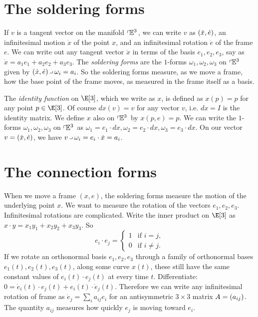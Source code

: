 \section{The soldering forms}
If \(v\) is a tangent vector on the manifold \(\left\ulcorner\!\mathbb{E}^{3}\right.\), we can write \(v\) as \(\left(\dot{x},\dot{e}\right)\), an infinitesimal motion \(\dot{x}\) of the point \(x\), and an infinitesimal rotation \(\dot{e}\) of the frame \(e\).
We can write out any tangent vector \(\dot{x}\) in terms of the basis \(e_1, e_2, e_3\), say as \(\dot{x} = a_1 e_1 + a_2 e_2 + a_3 e_3\).
The \emph{soldering forms} are the \(1\)-forms \(\omega_1, \omega_2, \omega_3\) on \(\left\ulcorner\!\mathbb{E}^{3}\right.\) given by \(\pr{\dot{x},\dot{e}} \hook \omega_i = a_i\).
So the soldering forms measure, as we move a frame, how the base point of the frame moves, as measured in the frame itself as a basis.

The \emph{identity function} on \(\E[3]\), which we write as \(x\), is defined as \(x(p)=p\) for any point \(p \in \E[3]\).
Of course \(dx(v)=v\) for any vector \(v\), i.e. \(dx=I\) is the identity matrix.
We define \(x\) also on \(\left\ulcorner\!\mathbb{E}^{3}\right.\) by \(x(p,e)=p\).
We can write the \(1\)-forms \(\omega_1, \omega_2, \omega_3\) on \(\left\ulcorner\!\mathbb{E}^{3}\right.\) as \(\omega_1=e_1 \cdot dx, \omega_2=e_2 \cdot dx, \omega_3=e_3 \cdot dx\).
On our vector \(v=\left(\dot{x},\dot{e}\right)\), we have \(v \hook \omega_i=e_i \cdot \dot{x}=a_i\).


\section{The connection forms}
When we move a frame \((x,e)\), the soldering forms measure the motion of the underlying point \(x\).
We want to measure the rotation of the vectors \(e_1, e_2, e_3\).
Infinitesimal rotations are complicated.
Write the inner product on \(\E[3]\) as \(x \cdot y=x_1 y_1 + x_2 y_2 + x_3 y_3\). 
So
\[
e_i \cdot e_j=
\begin{cases}
1 & \text{if \(i=j\)}, \\
0 & \text{if \(i\ne j\)}.
\end{cases}
\]
If we rotate an orthonormal basis \(e_1, e_2, e_3\) through a family of orthonormal bases \(e_1(t), e_2(t), e_3(t)\), along some curve \(x(t)\), these still have the same constant values of \(e_i(t) \cdot e_j(t)\) at every time \(t\).
Differentiate: \(0=\dot{e}_i(t) \cdot e_j(t) + e_i(t) \cdot \dot{e}_j(t)\).
Therefore we can write any infinitesimal rotation of frame as \(\dot{e}_j = \sum_i a_{ij} e_i\) for an antisymmetric \(3 \times 3\) matrix \(A=\left(a_{ij}\right)\).
The quantity \(a_{ij}\) measures how quickly \(e_j\) is moving toward \(e_i\).


